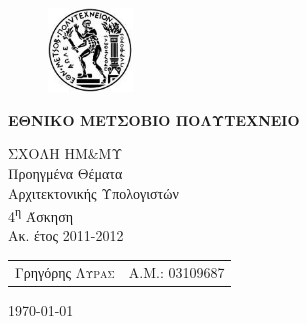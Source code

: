 \begin{titlepage}
    \begin{center}
        \begin{figure}[h] 
            \includegraphics[width=0.2\textwidth]{title/ntua_logo}
        \end{figure}
        \vspace{1cm}
        \begin{LARGE}\textbf{ΕΘΝΙΚΟ ΜΕΤΣΟΒΙΟ ΠΟΛΥΤΕΧΝΕΙΟ\\[1.5cm]}\end{LARGE}
        \begin{Large}
            ΣΧΟΛΗ ΗΜ\&ΜΥ\\[2cm]
            Προηγμένα Θέματα\\
            Αρχιτεκτονικής Υπολογιστών\\[2cm]
            4\textsuperscript{η} Άσκηση\\
            Ακ. έτος 2011-2012\\
        \end{Large}
        \vfill
        \begin{flushright}
            \begin{tabular}{l r}
                {Γρηγόρης \textsc{Λύρας}}&
                {Α.Μ.: 03109687}\\
            \end{tabular}
        \end{flushright}

        \large\today\\
    \end{center}
\end{titlepage}


